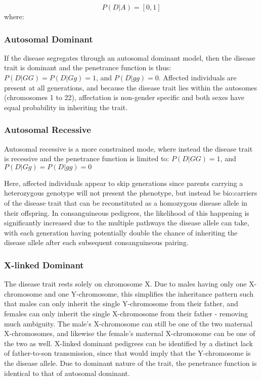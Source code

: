 \begin{equation}
P (D | A) = [0,1]
\end{equation}
where:
\begin{description}
\end{description}


\subsubsection{Autosomal Dominant}

If the disease segregates through an autosomal dominant model, then the disease trait is dominant and the penetrance function is thus:  \(P(D|GG) = P(D|Gg) = 1\), and \(P(D|gg)=0\).
Affected individuals are present at all generations, and because the disease trait lies within the autosomes (chromosomes 1 to 22), affectation is non-gender specific and both sexes have equal probability in inheriting the trait.

\subsubsection{Autosomal Recessive}

Autosomal recessive is a more constrained mode, where instead the disease trait is recessive and the penetrance function is limited to: \(P(D|GG)=1\), and \(P(D|Gg) = P(D|gg) = 0\)

Here, affected individuals appear to skip generations since parents carrying a heterozygous genotype will not present the phenotype, but instead be \gls{bio:carriers} of the disease trait that can be reconstituted as a homozygous disease allele in their offspring. In consanguineous pedigrees, the likelihood of this happening is significantly increased due to the multiple pathways the disease allele can take, with each generation having potentially double the chance of inheriting the disease allele after each subsequent consanguineous pairing.

\subsubsection{X-linked Dominant}

The disease trait rests solely on chromosome X.  Due to males having only one X-chromosome and one Y-chromosome, this simplifies the inheritance pattern such that males can only inherit the single Y-chromosome from their father, and females can only inherit the single  X-chromosome from their father - removing much ambiguity. The male's X-chromosome can still be one of the two maternal X-chromosomes, and likewise the female's maternal X-chromosome can be one of the two as well.  X-linked dominant pedigrees can be identified by a distinct lack of father-to-son transmission, since that would imply that the Y-chromosome is the disease allele. Due to dominant nature of the trait, the penetrance function is identical to that of autosomal dominant.

